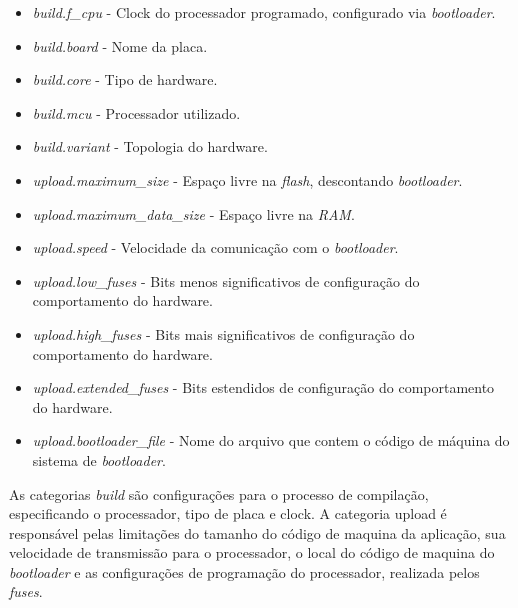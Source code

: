 \begin{itemize}

\item \textit{build.f\_cpu} - Clock do processador programado, configurado via \textit{bootloader}.

\item \textit{build.board} - Nome da placa.

\item \textit{build.core} - Tipo de hardware.

\item \textit{build.mcu} - Processador utilizado\cite{ATmega48A}.

\item \textit{build.variant} - Topologia do hardware.

\item \textit{upload.maximum\_size} - Espaço livre na \textit{flash}, descontando \textit{bootloader}.

\item \textit{upload.maximum\_data\_size} - Espaço livre na \textit{RAM}.

\item \textit{upload.speed} - Velocidade da comunicação com o \textit{bootloader}.

\item \textit{upload.low\_fuses} - Bits menos significativos de configuração do comportamento do hardware.

\item \textit{upload.high\_fuses} - Bits mais significativos de configuração do comportamento do hardware.

\item \textit{upload.extended\_fuses} - Bits estendidos de configuração do comportamento do hardware.

\item \textit{upload.bootloader\_file} - Nome do arquivo que contem o código de máquina do sistema de \textit{bootloader}.

\end{itemize}

As categorias \textit{build} são configurações para o processo de compilação, especificando o processador, tipo de placa e clock. A categoria upload é responsável pelas limitações do tamanho do código de maquina da aplicação, sua velocidade de transmissão para o processador, o local do código de maquina do \textit{bootloader} e as configurações de programação do processador, realizada pelos \textit{fuses}. 

